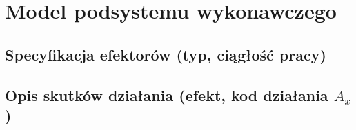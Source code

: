 \section{Model podsystemu wykonawczego}
\subsection{Specyfikacja efektorów (typ, ciągłość pracy)}
\subsection{Opis skutków działania (efekt, kod działania \(A_x\))}
